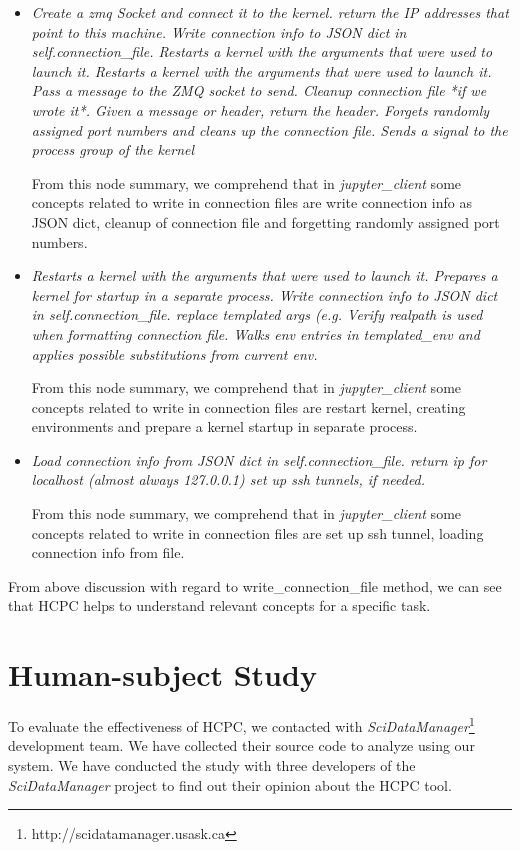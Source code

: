 \begin{itemize}
    \item \emph{Create a zmq Socket and connect it to the kernel. return the IP addresses that point to this machine. Write connection info to JSON dict in self.connection\_file. Restarts a kernel with the arguments that were used to launch it. Restarts a kernel with the arguments that were used to launch it. Pass a message to the ZMQ socket to send. Cleanup connection file *if we wrote it*. Given a message or header, return the header. Forgets randomly assigned port numbers and cleans up the connection file. Sends a signal to the process group of the kernel }
    
    From this node summary, we comprehend that in \emph{jupyter\_client} some concepts related to write in connection files are write connection info as JSON dict, cleanup of connection file and forgetting randomly assigned port numbers.
    
    \item \emph{ Restarts a kernel with the arguments that were used to launch it. Prepares a kernel for startup in a separate process. Write connection info to JSON dict in self.connection\_file. replace templated args (e.g. Verify realpath is used when formatting connection file. Walks env entries in templated\_env and applies possible substitutions from current env.}
    
    From this node summary, we comprehend that in \emph{jupyter\_client} some concepts related to write in connection files are restart kernel, creating environments and prepare a kernel startup in separate process.
    
    \item \emph{Load connection info from JSON dict in self.connection\_file. return ip for localhost (almost always 127.0.0.1) set up ssh tunnels, if needed.} 
    
    From this node summary, we comprehend that in \emph{jupyter\_client} some concepts related to write in connection files are set up ssh tunnel, loading connection info from file.
    
    
\end{itemize}

From above discussion with regard to write\_connection\_file method, we can see that HCPC helps to understand relevant concepts for a specific task. 

\section{Human-subject Study}
\label{hla3:human_study}
To evaluate the effectiveness of HCPC, we contacted with \emph{SciDataManager}\footnote{http://scidatamanager.usask.ca} development team. We have collected their source code to analyze using our system. We have conducted the study with three developers of the \emph{SciDataManager} project to find out their opinion about the HCPC tool.

